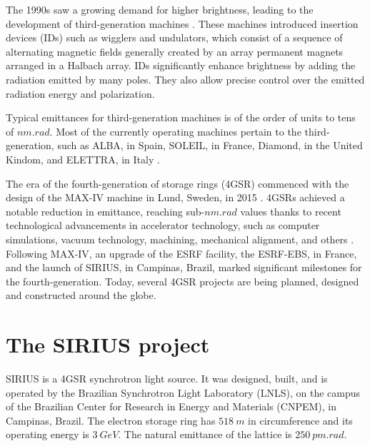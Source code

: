 The 1990s saw a growing demand for higher brightness, leading to the development of third-generation machines \cite{liu_towards_2017}. These machines introduced insertion devices (IDs) such as wigglers and undulators, which consist of a sequence of alternating magnetic fields generally created by an array permanent magnets arranged in a Halbach array. IDs significantly enhance brightness by adding the radiation emitted by many poles. They also allow precise control over the emitted radiation energy and polarization.

Typical emittances for third-generation machines is of the order of units to tens of $\unit{nm}.\unit{rad}$. Most of the currently operating machines pertain to the third-generation, such as ALBA, in Spain, SOLEIL, in France, Diamond, in the United Kindom, and ELETTRA, in Italy \cite{simoulin_synchrotron_2016}.

The era of the fourth-generation of storage rings (4GSR) commenced with the design of the MAX-IV machine in Lund, Sweden, in 2015 \cite{liu_towards_2017,hettel_challenges_2014}. 4GSRs achieved a notable reduction in emittance, reaching sub-$\unit{nm}.\unit{rad}$ values thanks to recent technological advancements in accelerator technology, such as computer simulations, vacuum technology, machining, mechanical alignment, and others  \cite{hettel_challenges_2014,liu_towards_2017}. Following MAX-IV, an upgrade of the ESRF facility, the ESRF-EBS, in France, and the launch of SIRIUS, in Campinas, Brazil, marked significant milestones for the fourth-generation. Today, several 4GSR projects are being planned, designed and constructed around the globe.

\section*{The SIRIUS project}

SIRIUS is a 4GSR synchrotron light source. It was designed, built, and is operated by the Brazilian Synchrotron Light Laboratory (LNLS), on the campus of the Brazilian Center for Research in Energy and Materials (CNPEM), in Campinas, Brazil. The electron storage ring has $518~\unit{m}$ in circumference and its operating energy is $3~\unit{GeV}$. The natural emittance of the lattice is $250~\unit{pm}.\unit{rad}$. 


